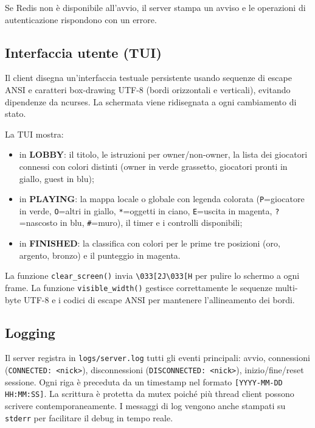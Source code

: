 \documentclass[a4paper,11pt]{article}
\begin{document}
Se Redis non è disponibile all'avvio, il server stampa un avviso e le
operazioni di autenticazione rispondono con un errore.

\subsection{Interfaccia utente (TUI)}

Il client disegna un'interfaccia testuale persistente usando sequenze
di escape ANSI e caratteri box-drawing UTF-8 (bordi orizzontali e
verticali), evitando dipendenze da ncurses.
La schermata viene ridisegnata a ogni cambiamento di stato.

La TUI mostra:
\begin{itemize}[topsep=0.3em]
    \item in \textbf{LOBBY}: il titolo, le istruzioni per owner/non-owner,
          la lista dei giocatori connessi con colori distinti (owner in verde
          grassetto, giocatori pronti in giallo, guest in blu);
    \item in \textbf{PLAYING}: la mappa locale o globale con legenda colorata
          (\texttt{P}=giocatore in verde, \texttt{O}=altri in giallo,
          \texttt{*}=oggetti in ciano, \texttt{E}=uscita in magenta,
          \texttt{?}=nascosto in blu, \texttt{\#}=muro), il timer e
          i controlli disponibili;
    \item in \textbf{FINISHED}: la classifica con colori per le prime tre
          posizioni (oro, argento, bronzo) e il punteggio in magenta.
\end{itemize}

La funzione \texttt{clear\_screen()} invia \texttt{\textbackslash033[2J\textbackslash033[H}
per pulire lo schermo a ogni frame. La funzione \texttt{visible\_width()} gestisce
correttamente le sequenze multi-byte UTF-8 e i codici di escape ANSI per
mantenere l'allineamento dei bordi.

\subsection{Logging}

Il server registra in \texttt{logs/server.log} tutti gli eventi principali:
avvio, connessioni (\texttt{CONNECTED: <nick>}), disconnessioni
(\texttt{DISCONNECTED: <nick>}), inizio/fine/reset sessione.
Ogni riga è preceduta da un timestamp nel formato
\texttt{[YYYY-MM-DD HH:MM:SS]}. La scrittura è protetta da mutex
poiché più thread client possono scrivere contemporaneamente.
I messaggi di log vengono anche stampati su \texttt{stderr} per
facilitare il debug in tempo reale.
\end{document}
